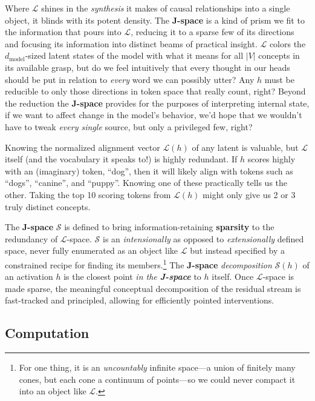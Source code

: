 \documentclass{article}
\newcommand{\jlens}{\mathscr{L}}
\newcommand{\jspace}{\mathscr{S}}
\newcommand{\dmodel}{d_{\text{model}}}
\begin{document}
Where \(\jlens\) shines in the \textit{synthesis} it makes of causal relationships into a single object, it blinds with its potent density. The \textbf{J-space} is a kind of prism we fit to the information that pours into \(\jlens\), reducing it to a sparse few of its directions and focusing its information into distinct beams of practical insight. \(\jlens\) colors the \(\dmodel\)-sized latent states of the model with what it means for all \(|V|\) concepts in its available grasp, but do we feel intuitively that every thought in our heads should be put in relation to \textit{every} word we can possibly utter? Any \(h\) must be reducible to only those directions in token space that really count, right? Beyond the reduction the \textbf{J-space} provides for the purposes of interpreting internal state, if we want to affect change in the model's behavior, we'd hope that we wouldn't have to tweak \textit{every single} source, but only a privileged few, right? 

Knowing the normalized alignment vector \(\jlens(h)\) of any latent is valuable, but \(\jlens\) itself (and the vocabulary it speaks to!) is highly redundant. If \(h\) scores highly with an (imaginary) token, ``dog'', then it will likely align with tokens such as ``dogs'', ``canine'', and ``puppy''. Knowing one of these practically tells us the other. Taking the top 10 scoring tokens from \(\jlens(h)\) might only give us 2 or 3 truly distinct concepts.

The \textbf{J-space} \(\jspace\) is defined to bring information-retaining \textbf{sparsity} to the redundancy of \(\jlens\)-space. \(\jspace\) is an \textit{intensionally} as opposed to \textit{extensionally} defined space, never fully enumerated as an object like \(\jlens\) but instead specified by a constrained recipe for finding its members.\footnote{For one thing, it is an \textit{uncountably} infinite space---a union of finitely many cones, but each cone a continuum of points---so we could never compact it into an object like \(\jlens\).} The \textbf{J-space} \textit{decomposition} \(\jspace(h)\) of an activation \(h\) is the closest point \textit{in the \textbf{J-space}} to \(h\) itself. Once \(\jlens\)-space is made sparse, the meaningful conceptual decomposition of the residual stream is fast-tracked and principled, allowing for efficiently pointed interventions.

\subsection{Computation}\label{sec:jspacecomp}
\end{document}
